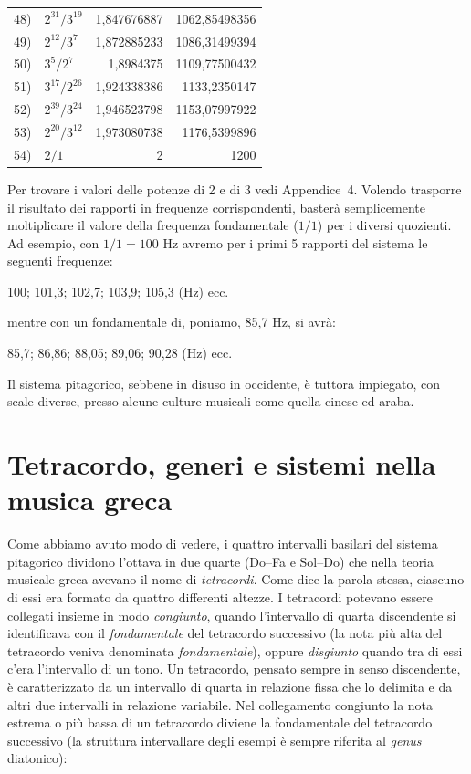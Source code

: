 {\begin{longtable}{r @{\;} l r r}
    48) & $2^{31}/3^{19}$ & 1,847676887   & 1062,85498356 \\
    49) & $2^{12}/3^{7}$  & 1,872885233   & 1086,31499394 \\
    50) & $3^{5}/2^{7}$   & 1,8984375     & 1109,77500432 \\
    51) & $3^{17}/2^{26}$ & 1,924338386   & 1133,2350147 \\
    52) & $2^{39}/3^{24}$ & 1,946523798   & 1153,07997922 \\
    53) & $2^{20}/3^{12}$ & 1,973080738   & 1176,5399896 \\
    54) & $2/1$           & 2             & 1200 \\
\end{longtable}
}

Per trovare i valori delle potenze di 2 e di 3 vedi Appendice~4. Volendo
trasporre il risultato dei rapporti in frequenze corrispondenti, basterà
semplicemente moltiplicare il valore della frequenza fondamentale ($1/1$) per
i diversi quozienti. Ad esempio, con $1/1 = 100$ Hz avremo per i primi 5
rapporti del sistema le seguenti frequenze:

\begin{center}
  100; 101,3; 102,7; 103,9; 105,3 (Hz) ecc.
\end{center}

mentre con un fondamentale di, poniamo, 85,7 Hz, si avrà:

\begin{center}
  85,7; 86,86; 88,05; 89,06; 90,28 (Hz) ecc.
\end{center}

Il sistema pitagorico, sebbene in disuso in occidente, è tuttora impiegato,
con scale diverse, presso alcune culture musicali come quella cinese ed araba.

\newpage


\section{Tetracordo, generi e sistemi nella musica greca}

Come abbiamo avuto modo di vedere, i quattro intervalli basilari del sistema
pitagorico dividono l'ottava in due quarte (Do--Fa e Sol--Do) che nella teoria
musicale greca avevano il nome di \emph{tetracordi}. Come dice la parola
stessa, ciascuno di essi era formato da quattro differenti altezze. I
tetracordi potevano essere collegati insieme in modo \emph{congiunto}, quando
l'intervallo di quarta discendente si identificava con il \emph{fondamentale}
del tetracordo successivo (la nota più alta del tetracordo veniva denominata
\emph{fondamentale}), oppure \emph{disgiunto} quando tra di essi c'era
l'intervallo di un tono. Un tetracordo, pensato sempre in senso discendente, è
caratterizzato da un intervallo di quarta in relazione fissa che lo delimita e
da altri due intervalli in relazione variabile. Nel collegamento congiunto la
nota estrema o più bassa di un tetracordo diviene la fondamentale del
tetracordo successivo (la struttura intervallare degli esempi è sempre riferita
al \emph{genus} diatonico):


